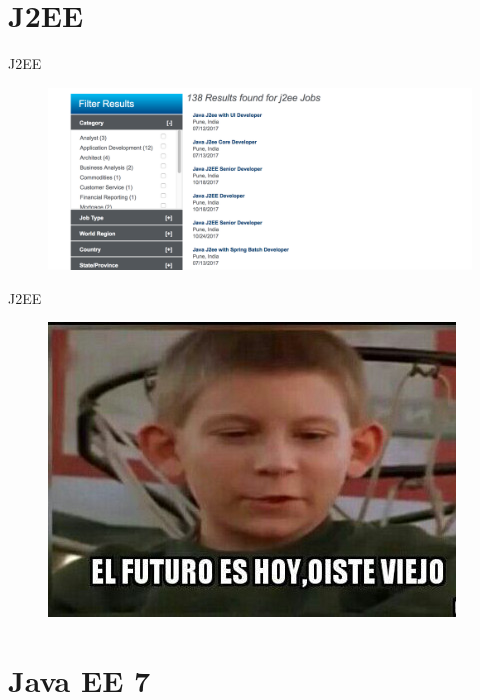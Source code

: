 \documentclass{beamer}
\begin{document}



\section{J2EE}

\begin{frame}{J2EE}
\begin{figure}
	\centering
	\includegraphics[width=\linewidth]{Images/jobs}
\end{figure}
\end{frame}

\begin{frame}{J2EE}
\begin{figure}
\centering
\includegraphics[width=0.6\linewidth]{Images/futuro}
\end{figure}
\end{frame}

\section{Java EE 7}
\end{document}
